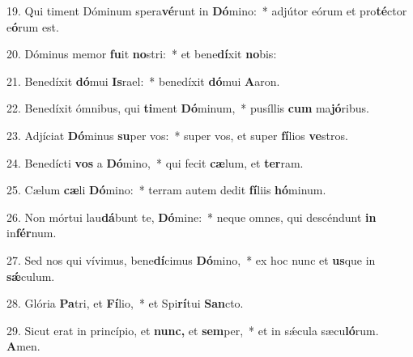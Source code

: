 \item 19. Qui timent Dóminum spera\textbf{vé}runt in \textbf{Dó}mino:~* adjútor eórum et pro\textbf{té}ctor e\textbf{ó}rum est.
\item 20. Dóminus memor \textbf{fu}it \textbf{no}stri:~* et bene\textbf{dí}xit \textbf{no}bis:
\item 21. Benedíxit \textbf{dó}mui \textbf{Is}rael:~* benedíxit \textbf{dó}mui \textbf{A}aron.
\item 22. Benedíxit ómnibus, qui \textbf{ti}ment \textbf{Dó}minum,~* pusíllis \textbf{cum} ma\textbf{jó}ribus.
\item 23. Adjíciat \textbf{Dó}minus \textbf{su}per vos:~* super vos, et super \textbf{fí}lios \textbf{ve}stros.
\item 24. Benedícti \textbf{vos} a \textbf{Dó}mino,~* qui fecit \textbf{cæ}lum, et \textbf{ter}ram.
\item 25. Cælum \textbf{cæ}li \textbf{Dó}mino:~* terram autem dedit \textbf{fí}liis \textbf{hó}minum.
\item 26. Non mórtui lau\textbf{dá}bunt te, \textbf{Dó}mine:~* neque omnes, qui descéndunt \textbf{in} in\textbf{fér}num.
\item 27. Sed nos qui vívimus, bene\textbf{dí}cimus \textbf{Dó}mino,~* ex hoc nunc et \textbf{us}que in \textbf{sǽ}culum.
\item 28. Glória \textbf{Pa}tri, et \textbf{Fí}lio,~* et Spi\textbf{rí}tui \textbf{San}cto.
\item 29. Sicut erat in princípio, et \textbf{nunc,} et \textbf{sem}per,~* et in sǽcula sæcu\textbf{ló}rum. \textbf{A}men.
